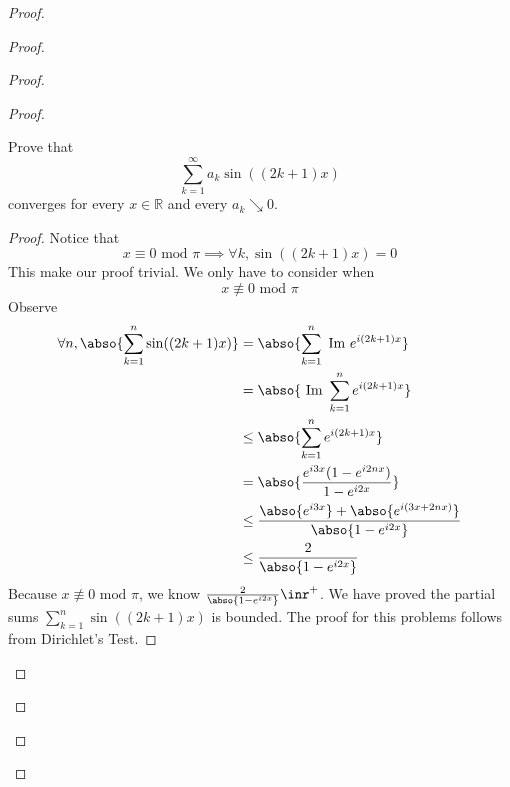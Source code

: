 \documentclass{report}
\begin{document}
\begin{proof}
\begin{proof}
\begin{proof}
\begin{proof}
\begin{question}{}{}
Prove that 
\[
\sum_{k=1}^{\infty} a_k \sin((2k + 1)x)
\]
converges for every \( x \in \mathbb{R} \) and every \( a_k \searrow 0 \).
\end{question}
\begin{proof}
Notice that  
\begin{equation*}
x\equiv 0\text{ mod $\pi$}\implies \forall k,\sin ((2k+1)x)=0
\end{equation*}
This make our proof trivial. We only have to consider when 
\begin{equation*}
x\not\equiv 0\text{ mod }\pi
\end{equation*}
Observe
\begin{align*}
 \forall n, \abso{\sum_{k=1}^n \sin((2k+1)x)}&= \abso{\sum_{k=1}^n \text{ Im }e^{i(2k+1)x}}\\
  &=\abso{\text{ Im }\sum_{k=1}^n e^{i(2k+1)x}}\\
  &\leq \abso{\sum_{k=1}^n e^{i(2k+1)x}}\\
  &=\abso{\frac{e^{i3x}(1-e^{i2nx})}{1-e^{i2x}}}\\
  &\leq \frac{\abso{e^{i3x}}+\abso{e^{i(3x+2nx)}}}{\abso{1-e^{i2x}}}\\
  &\leq \frac{2}{\abso{1-e^{i 2x}}}
\end{align*}
Because $x\not\equiv 0\text{ mod $\pi$}$, we know $\frac{2}{\abso{1-e^{i2x}}}\inr^+$. We have proved the partial sums $\sum_{k=1}^n \sin((2k+1)x)$ is bounded. The proof for this problems follows from Dirichlet's Test.

\end{proof}


\end{proof}
\end{proof}
\end{proof}
\end{proof}
\end{document}
